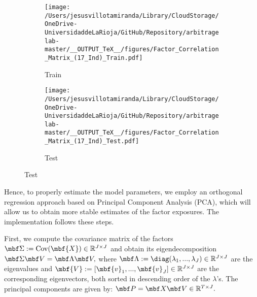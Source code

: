 \begin{figure}[H]
  \centering
  \caption{Factor Correlation Matrix}
  \begin{subfigure}{\textwidth}
  \centering	
  \caption{Train}
  \texttt{[image: /Users/jesusvillotamiranda/Library/CloudStorage/OneDrive-UniversidaddeLaRioja/GitHub/Repository/arbitragelab-master/\_\_OUTPUT\_TeX\_\_/figures/Factor\_Correlation\_Matrix\_(17\_Ind)\_Train.pdf]}
  \label{subfig:factor_corr_matrix_train}
  \end{subfigure}

	\vspace{0.5cm} %

  \begin{subfigure}{\textwidth}
  \centering
  \caption{Test}
  \texttt{[image: /Users/jesusvillotamiranda/Library/CloudStorage/OneDrive-UniversidaddeLaRioja/GitHub/Repository/arbitragelab-master/\_\_OUTPUT\_TeX\_\_/figures/Factor\_Correlation\_Matrix\_(17\_Ind)\_Test.pdf]}
  \label{subfig:factor_corr_matrix_test}
  \end{subfigure}
\label{fig:factor_corr_matrix}
\end{figure}


Hence, to properly estimate the model parameters, we employ an orthogonal regression approach based on Principal Component Analysis (PCA), which will allow us to obtain more stable estimates of the factor exposures. The implementation follows these steps. 

%
First, we compute the covariance matrix of the factors $\mbf \Sigma := \text{Cov}({\mbf{X}})\in \mathbb R^{J\times J}$ and obtain its eigendecomposition
$
\mbf \Sigma \mbf V = \mbf \Lambda \mbf V,
$
where $\mbf \Lambda:=\diag(\lambda_1,...,\lambda_J)\in \mathbb R^{J\times J}$ are the eigenvalues and $\mbf{V} := [\mbf{v}_1,...,\mbf{v}_J]\in \mathbb R^{J\times J}$ are the corresponding eigenvectors, both sorted in descending order of the $\lambda$'s. 
The principal components are given by:
$
\mbf P = {\mbf X} \mbf V \in \mathbb{R}^{T\times J}.
$

